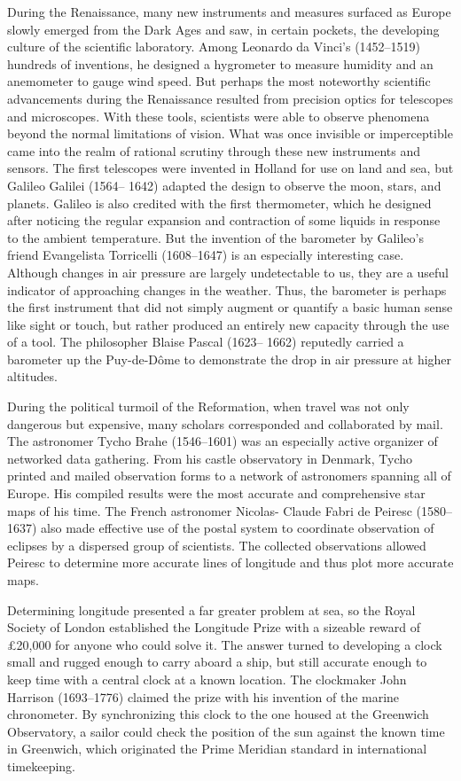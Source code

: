 During the Renaissance, many new instruments and measures surfaced as
Europe slowly emerged from the Dark Ages and saw, in certain pockets, the
developing culture of the scientific laboratory. Among Leonardo da Vinci's (1452–1519) hundreds of inventions, he designed a hygrometer to measure
humidity and an anemometer to gauge wind speed. But perhaps the most
noteworthy scientific advancements during the Renaissance resulted from
precision optics for telescopes and microscopes. With these tools, scientists
were able to observe phenomena beyond the normal limitations of vision.
What was once invisible or imperceptible came into the realm of rational
scrutiny through these new instruments and sensors. The first telescopes
were invented in Holland for use on land and sea, but Galileo Galilei (1564–
1642) adapted the design to observe the moon, stars, and planets. Galileo
is also credited with the first thermometer, which he designed after noticing
the regular expansion and contraction of some liquids in response to
the ambient temperature. But the invention of the barometer by Galileo's
friend Evangelista Torricelli (1608–1647) is an especially interesting case.
Although changes in air pressure are largely undetectable to us, they are a
useful indicator of approaching changes in the weather. Thus, the barometer
is perhaps the first instrument that did not simply augment or quantify
a basic human sense like sight or touch, but rather produced an entirely new
capacity through the use of a tool. The philosopher Blaise Pascal (1623–
1662) reputedly carried a barometer up the Puy-de-Dôme to demonstrate
the drop in air pressure at higher altitudes.

During the political turmoil of the Reformation, when travel was not only
dangerous but expensive, many scholars corresponded and collaborated by
mail. The astronomer Tycho Brahe (1546–1601) was an especially active
organizer of networked data gathering. From his castle observatory in Denmark,
Tycho printed and mailed observation forms to a network of astronomers
spanning all of Europe. His compiled results were the most accurate
and comprehensive star maps of his time. The French astronomer Nicolas-
Claude Fabri de Peiresc (1580–1637) also made effective use of the postal
system to coordinate observation of eclipses by a dispersed group of scientists.
The collected observations allowed Peiresc to determine more accurate
lines of longitude and thus plot more accurate maps.

Determining longitude presented a far greater problem at sea, so the Royal
Society of London established the Longitude Prize with a sizeable reward
of £20,000 for anyone who could solve it. The answer turned to developing
a clock small and rugged enough to carry aboard a ship, but still accurate
enough to keep time with a central clock at a known location. The clockmaker
John Harrison (1693–1776) claimed the prize with his invention of
the marine chronometer. By synchronizing this clock to the one housed at
the Greenwich Observatory, a sailor could check the position of the sun
against the known time in Greenwich, which originated the Prime Meridian
standard in international timekeeping.


